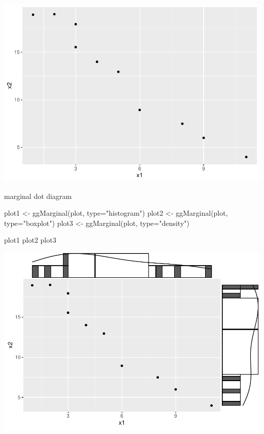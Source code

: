 \documentclass[
]{article}
\newenvironment{Shaded}{\begin{snugshade}}{\end{snugshade}}
\newcommand{\AttributeTok}[1]{\textcolor[rgb]{0.77,0.63,0.00}{#1}}
\newcommand{\FunctionTok}[1]{\textcolor[rgb]{0.00,0.00,0.00}{#1}}
\newcommand{\NormalTok}[1]{#1}
\newcommand{\OtherTok}[1]{\textcolor[rgb]{0.56,0.35,0.01}{#1}}
\newcommand{\StringTok}[1]{\textcolor[rgb]{0.31,0.60,0.02}{#1}}
\begin{document}
\includegraphics{Tarea1_files/figure-latex/unnamed-chunk-3-1.pdf}

marginal dot diagram

\begin{Shaded}
\begin{Highlighting}[]
\NormalTok{plot1 }\OtherTok{\textless{}{-}} \FunctionTok{ggMarginal}\NormalTok{(plot, }\AttributeTok{type=}\StringTok{"histogram"}\NormalTok{)}
\NormalTok{plot2 }\OtherTok{\textless{}{-}} \FunctionTok{ggMarginal}\NormalTok{(plot, }\AttributeTok{type=}\StringTok{"boxplot"}\NormalTok{)}
\NormalTok{plot3 }\OtherTok{\textless{}{-}} \FunctionTok{ggMarginal}\NormalTok{(plot, }\AttributeTok{type=}\StringTok{"density"}\NormalTok{)}

\NormalTok{plot1}
\NormalTok{plot2}
\NormalTok{plot3}
\end{Highlighting}
\end{Shaded}

\includegraphics{Tarea1_files/figure-latex/unnamed-chunk-4-1.pdf}
\end{document}
